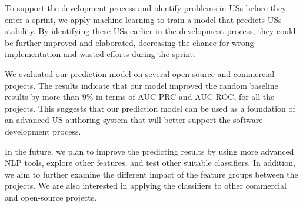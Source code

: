 To support the development process and identify problems in USs before they enter a sprint, we apply machine learning to train a model that predicts USs stability. By identifying these USs earlier in the development process, they could be further improved and elaborated, decreasing the chance for wrong implementation and wasted efforts during the sprint.

We evaluated our prediction model on several open source and commercial projects. The results indicate that our model improved the random baseline results by more than 9\% in terms of AUC PRC and AUC ROC, for all the projects. This suggests that our prediction model can be used as a foundation of an advanced US authoring system that will better support the software development process. 



 
In the future, we plan to improve the predicting results by using more advanced NLP tools, explore other features, and test other suitable classifiers. In addition, we aim to further examine the different impact of the feature groups between the projects. We are also interested in applying the classifiers to other commercial and open-source projects. 






















